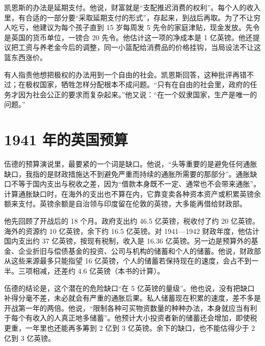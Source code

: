 凯恩斯的办法是延期支付。他说，财富就是“支配推迟消费的权利”\cite{keynes1940}。每个人的收入里，有合适的一部分要“采取延期支付的形式”，存起来，到战后再取\cite{keynes1940}。为了不让穷人吃亏，他建议为每个孩子直到 15 岁每周发 5 先令的家庭津贴，现金发放\cite{keynes1940}。先令是英国的货币单位，一镑合 20 先令。他估计这一项的净成本是 1 亿英镑\cite{keynes1940}。他还提议把工资与养老金今后的调整，同一小篮配给消费品的价格挂钩，当局设法不让这篮东西涨价\cite{keynes1940}。

有人指责他想把极权的办法用到一个自由的社会。凯恩斯回答，这种批评再错不过；在极权国家，牺牲怎样分配根本不成问题\cite{keynes1940}。“只有在自由的社会里，政府的任务才因为社会公正的要求而复杂起来。”\cite{keynes1940}他又说：“在一个奴隶国家，生产是唯一的问题。”\cite{keynes1940}

\section{1941 年的英国预算}\label{sec:warfinance-budget}

伍德的预算演说里，最要紧的一个词是缺口。他说，“头等重要的是避免任何通胀缺口，我指的是财政措施达不到避免严重而持续的通胀所需要的那部分”\cite{hansard1941}。通胀缺口不等于国内支出与税收之差，因为“借款本身既不一定、通常也不会带来通胀”\cite{hansard1941}。计算通胀缺口时，在海外的支出也不算在内，它靠变卖各种资本资产或积累英镑余额来支付\cite{hansard1941}。英镑余额是自治领与印度留在伦敦的英镑，大多能再借给财政部\cite{hansard1941}。

他先回顾了开战后的 18 个月\cite{hansard1941}。政府支出约 46.5 亿英镑，税收付了约 20 亿英镑\cite{hansard1941}。海外的资源约 10 亿英镑，余下约 16.5 亿英镑\cite{hansard1941}。对 1941—1942 财政年度，他估计国内支出约 37 亿英镑，按现有税制，收入是 16.36 亿英镑\cite{hansard1941}。另一边是预算外的基金、企业折旧与偿债基金的投资、公司与机构的储蓄和个人的储蓄\cite{hansard1941}。他说，财政部从这些来源最多只能指望 16 亿英镑，个人的储蓄若保持现在的速度，会占不到一半\cite{hansard1941}。三项相减，还差约 4.6 亿英镑（本书的计算）。

伍德的结论是，这个潜在的危险缺口“在 5 亿英镑的量级”\cite{hansard1941}。他也说，没有把缺口补得分毫不差，未必就会有严重的通胀后果\cite{hansard1941}。私人储蓄现在积累的速度，差不多是开战第一年的两倍\cite{hansard1941}。他说，“限制各种可买物资数量的种种办法，本身就应当有利于每个有收入的人真正地多储蓄”\cite{hansard1941}。他预计大小投资者新的储蓄还会增加，即使税更重，一年里也还能再多筹到 2 亿到 3 亿英镑\cite{hansard1941}。余下的缺口，也不能估得少于 2 亿到 3 亿英镑\cite{hansard1941}。

